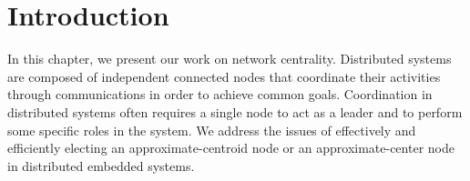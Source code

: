 





\section{Introduction}

In this chapter, we present our work on network centrality. Distributed systems are composed of independent connected nodes that coordinate their activities through communications in order to achieve common goals. Coordination in distributed systems often requires a single node to act as a leader and to perform some specific roles in the system. We address the issues of effectively and efficiently electing an approximate-centroid node or an approximate-center node in distributed embedded systems. 

